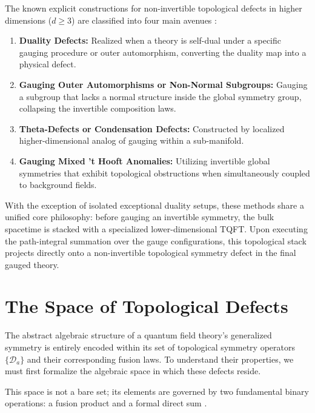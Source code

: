 \documentclass[aps,preprint,nofootinbib,preprintnumbers,eqsecnum,superscriptaddress]{revtex4}
\numberwithin{equation}{section}
\begin{document}
The known explicit constructions for non-invertible topological defects in higher dimensions ($d \geq 3$) are classified into four main avenues \cite{schafernameki2023ictplecturesnoninvertiblegeneralized}:
\begin{enumerate}[\itshape i)]
    \item {\bf Duality Defects:} Realized when a theory is self-dual under a specific gauging procedure or outer automorphism, converting the duality map into a physical defect.
    \item {\bf Gauging Outer Automorphisms or Non-Normal Subgroups:} Gauging a subgroup that lacks a normal structure inside the global symmetry group, collapsing the invertible composition laws.
    \item {\bf Theta-Defects or Condensation Defects:} Constructed by localized higher-dimensional analog of gauging within a sub-manifold.
    \item {\bf Gauging Mixed 't Hooft Anomalies:} Utilizing invertible global symmetries that exhibit topological obstructions when simultaneously coupled to background fields.
\end{enumerate}

With the exception of isolated exceptional duality setups, these methods share a unified core philosophy: before gauging an invertible symmetry, the bulk spacetime is stacked with a specialized lower-dimensional TQFT. Upon executing the path-integral summation over the gauge configurations, this topological stack projects directly onto a non-invertible topological symmetry defect in the final gauged theory.

\newpage 

\section{The Space of Topological Defects}
\label{sec:topo_operator_space}

The abstract algebraic structure of a quantum field theory's generalized symmetry is entirely encoded within its set of topological symmetry operators $\{ \mathcal{D}_a\}$ and their corresponding fusion laws. To understand their properties, we must first formalize the algebraic space in which these defects reside.

This space is not a bare set; its elements are governed by two fundamental binary operations: a fusion product and a formal direct sum \cite{shao2024whatsundonetasilectures}.
\end{document}
